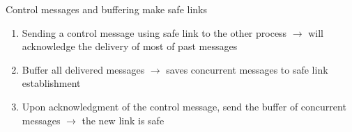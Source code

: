 \documentclass[10pt, xcolor={usenames, dvipsnames}]{beamer}
\begin{document}
\begin{frame}{Control messages and buffering make safe links}
  
  \begin{enumerate}
  \item Sending a control message using safe link to the other process
    $\rightarrow$ will acknowledge the delivery of most of past messages
  \item Buffer all delivered messages $\rightarrow$ saves concurrent messages to
    safe link establishment
  \item Upon acknowledgment of the control message, send the buffer of
    concurrent messages $\rightarrow$ the new link is safe
  \end{enumerate}


  \begin{minipage}{0.32\textwidth}
    \vspace{4pt}
    \begin{center}
      
    \end{center}
  \end{minipage}
  \begin{minipage}{0.32\textwidth}
    \begin{center}
      
    \end{center}
  \end{minipage}
  \begin{minipage}{0.32\textwidth}
    \begin{center}
      
    \end{center}
  \end{minipage}
  
  \begin{center}
  \begin{minipage}{0.35\textwidth}
    \begin{center}
      
    \end{center}
  \end{minipage}
  \begin{minipage}{0.35\textwidth}
    \begin{center}
    \vspace{9pt}
      
    \end{center}
  \end{minipage}
  \end{center}    


\end{frame}
\end{document}
